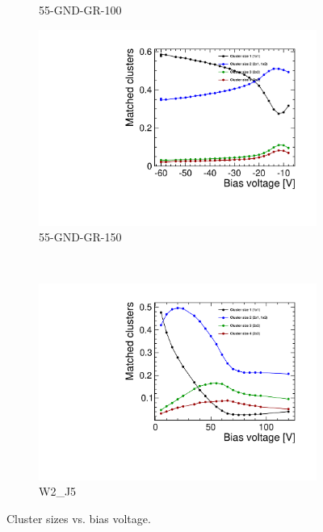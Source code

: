 \begin{figure}[htbp]
\begin{subfigure}[b]{0.33\textwidth}
    \caption{55-GND-GR-100}
  \end{subfigure}\hfill
  \begin{subfigure}[b]{0.33\textwidth}
    \includegraphics[width=\textwidth]{./figures/TestBeam/cluSize_bias_W0005_F01.pdf}
    \caption{55-GND-GR-150}
  \end{subfigure}\\
  \begin{subfigure}[b]{0.33\textwidth}
    \includegraphics[width=\textwidth]{./figures/TestBeam/cluSize_bias_W0002_J05.pdf}
    \caption{W2\_J5}
  \end{subfigure}
  \caption{Cluster sizes vs. bias voltage.}
  \label{fig:clusterSize_vs_biasVoltage}
\end{figure}

